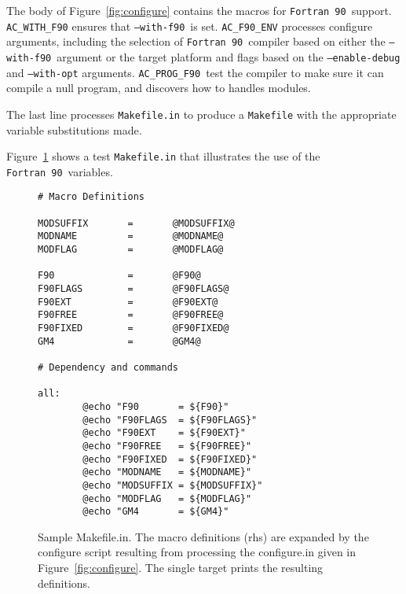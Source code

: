 \documentclass[11pt]{nmemo}
\newcommand{\fninety}{\texttt{Fortran~90}}
\newcommand{\withfninety}{\texttt{--with-f90}}
\newcommand{\progfninety}{\texttt{AC\_PROG\_F90}}
\begin{document}
The body of Figure~\ref{fig:configure} contains the macros for
\fninety\ support.  \texttt{AC\_WITH\_F90} ensures that \withfninety\
is set.  \texttt{AC\_F90\_ENV} processes configure arguments,
including the selection of \fninety\ compiler based on either the
\withfninety\ argument or the target platform and flags based on the
\texttt{--enable-debug} and \texttt{--with-opt} arguments.
\progfninety\ test the compiler to make sure it can compile a null
program, and discovers how to handles modules.

The last line processes \texttt{Makefile.in} to produce a
\texttt{Makefile} with the appropriate variable substitutions made.

Figure~\ref{fig:makefile} shows a test \texttt{Makefile.in} that
illustrates the use of the \fninety\ variables.  
\begin{figure}[phbt]
\hrulefill
\begin{verbatim}
# Macro Definitions

MODSUFFIX       =       @MODSUFFIX@
MODNAME         =       @MODNAME@
MODFLAG         =       @MODFLAG@

F90             =       @F90@
F90FLAGS        =       @F90FLAGS@
F90EXT          =       @F90EXT@
F90FREE         =       @F90FREE@
F90FIXED        =       @F90FIXED@
GM4             =       @GM4@

# Dependency and commands

all:
        @echo "F90       = ${F90}"
        @echo "F90FLAGS  = ${F90FLAGS}"
        @echo "F90EXT    = ${F90EXT}"
        @echo "F90FREE   = ${F90FREE}"
        @echo "F90FIXED  = ${F90FIXED}"
        @echo "MODNAME   = ${MODNAME}"
        @echo "MODSUFFIX = ${MODSUFFIX}"
        @echo "MODFLAG   = ${MODFLAG}"
        @echo "GM4       = ${GM4}"
\end{verbatim}%
\caption{Sample Makefile.in.  The macro definitions (rhs) are expanded
by the configure script resulting from processing the configure.in
given in Figure~\ref{fig:configure}.  The single target prints the
resulting definitions.}\label{fig:makefile} \hrulefill
\end{figure}
\end{document}
